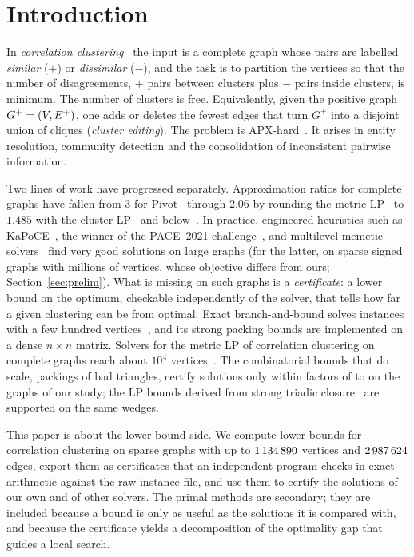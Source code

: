 \section{Introduction}\label{sec:intro}

In \emph{correlation clustering}~\cite{BansalBC04} the input is a complete
graph whose pairs are labelled \emph{similar} ($+$) or \emph{dissimilar}
($-$), and the task is to partition the vertices so that the number of
disagreements, $+$ pairs between clusters plus $-$ pairs inside clusters, is
minimum.  The number of clusters is free.  Equivalently, given the positive
graph $G^+=(V,E^{+})$, one adds or deletes the fewest edges that turn $G^+$ into
a disjoint union of cliques (\emph{cluster editing}).  The problem is
APX-hard~\cite{CharikarGW05}.  It arises in entity resolution, community
detection and the consolidation of inconsistent pairwise information.

Two lines of work have progressed separately.  Approximation ratios for
complete graphs have fallen from $3$ for Pivot~\cite{AilonCN08} through
$2.06$ by rounding the metric LP~\cite{ChawlaMSY15} to $1.485$ with the
cluster LP~\cite{CaoCLLNV24} and below~\cite{GarciaSorianoS26}.  In practice,
engineered heuristics such as KaPoCE~\cite{BlasiusEtAl21kapoceHeur}, the
winner of the PACE~2021 challenge~\cite{KellerhalsKNZ21pace}, and multilevel
memetic solvers~\cite{hausberger2025scc} find very good solutions on large
graphs (for the latter, on sparse signed graphs with millions of vertices,
whose objective differs from ours; Section~\ref{sec:prelim}).  What is missing on such graphs is a
\emph{certificate}: a lower bound on the optimum, checkable independently of
the solver, that tells how far a given clustering can be from optimal.  Exact
branch-and-bound solves instances with a few hundred
vertices~\cite{BlasiusEtAl22sea}, and its strong packing bounds are
implemented on a dense $n\times n$ matrix.  Solvers for the metric LP of
correlation clustering on complete graphs reach about $10^4$
vertices~\cite{veldt2019metric,ruggles2020parallel}.  The combinatorial
bounds that do scale, packings of bad triangles, certify solutions only within
factors of \numBaseFacLo{} to \numBaseFacHi{} on the graphs of our study;
the LP bounds derived from strong triadic closure~\cite{veldt2022stc} are
supported on the same wedges.

This paper is about the lower-bound side.  We compute lower bounds for
correlation clustering on sparse graphs with up to
$\num{1134890}{}$ vertices and $\num{2987624}{}$ edges, export them as
certificates that an independent program checks in exact arithmetic against
the raw instance file, and use them to certify the solutions of our own and of
other solvers.  The primal methods are secondary; they are included because a
bound is only as useful as the solutions it is compared with, and because the
certificate yields a decomposition of the optimality gap that guides a local
search.

